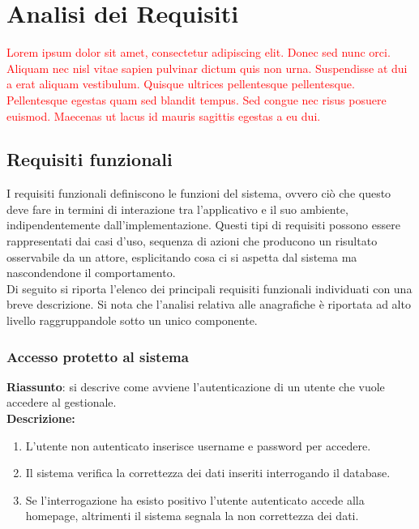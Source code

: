\chapter{Analisi dei Requisiti}
\label{cha:intro}

\textcolor{red}{Lorem ipsum dolor sit amet, consectetur adipiscing elit. Donec sed nunc orci. Aliquam nec nisl vitae sapien pulvinar dictum quis non urna. Suspendisse at dui a erat aliquam vestibulum. Quisque ultrices pellentesque pellentesque. Pellentesque egestas quam sed blandit tempus. Sed congue nec risus posuere euismod. Maecenas ut lacus id mauris sagittis egestas a eu dui.}




\section{Requisiti funzionali}
\label{sec:funzionali}
I requisiti funzionali definiscono le funzioni del sistema, ovvero ciò che questo deve fare in termini di interazione tra l'applicativo e il suo ambiente, indipendentemente dall'implementazione. Questi tipi di requisiti possono essere rappresentati dai casi d'uso, sequenza di azioni che producono un risultato osservabile da un attore, esplicitando cosa ci si aspetta dal sistema ma nascondendone il comportamento.\\
Di seguito si riporta l'elenco dei principali requisiti funzionali individuati con una breve descrizione. Si nota che l'analisi relativa alle anagrafiche è riportata ad alto livello raggruppandole sotto un unico componente.
\subsection{Accesso protetto al sistema}
\textbf{Riassunto}: si descrive come avviene l'autenticazione di un utente che vuole accedere al gestionale.\\
\textbf{Descrizione:}
\begin{enumerate}
  \item L'utente non autenticato inserisce username e password per accedere.
  \item Il sistema verifica la correttezza dei dati inseriti interrogando il database.
  \item Se l'interrogazione ha esisto positivo l'utente autenticato accede alla homepage, altrimenti il sistema segnala la non correttezza dei dati.
\end{enumerate}

